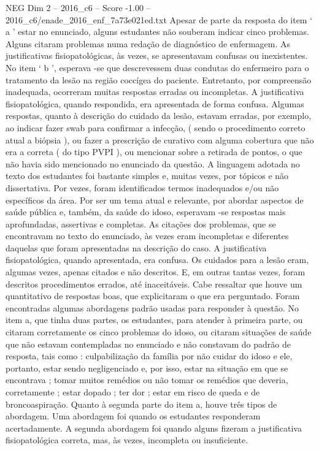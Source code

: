\begin{textsample}{NEG Dim 2 – 2016\_c6 – Score -1.00 – 2016\_c6/enade\_2016\_enf\_7a73e021ed.txt}
Apesar de parte da resposta do item ‘ a ’ estar no enunciado, alguns estudantes não souberam indicar cinco problemas.
Alguns citaram problemas numa redação de diagnóstico de enfermagem.
As justificativas fisiopatológicas, às vezes, se apresentavam confusas ou inexistentes.
No item ‘ b ’, esperava -se que descrevessem duas condutas do enfermeiro para o tratamento da lesão na região coccígea do paciente.
Entretanto, por compreensão inadequada, ocorreram muitas respostas erradas ou incompletas.
A justificativa fisiopatológica, quando respondida, era apresentada de forma confusa.
Algumas respostas, quanto à descrição do cuidado da lesão, estavam erradas, por exemplo, ao indicar fazer swab para confirmar a infecção, ( sendo o procedimento correto atual a biópsia ), ou fazer a prescrição de curativo com alguma cobertura que não era a correta ( do tipo PVPI ), ou mencionar sobre a retirada de pontos, o que não havia sido mencionado no enunciado da questão.
A linguagem adotada no texto dos estudantes foi bastante simples e, muitas vezes, por tópicos e não dissertativa.
Por vezes, foram identificados termos inadequados e/ou não específicos da área.
Por ser um tema atual e relevante, por abordar aspectos de saúde pública e, também, da saúde do idoso, esperavam -se respostas mais aprofundadas, assertivas e completas.
As citações dos problemas, que se encontravam no texto do enunciado, às vezes eram incompletas e diferentes daquelas que foram apresentadas na descrição do caso.
A justificativa fisiopatológica, quando apresentada, era confusa.
Os cuidados para a lesão eram, algumas vezes, apenas citados e não descritos.
E, em outras tantas vezes, foram descritos procedimentos errados, até inaceitáveis.
Cabe ressaltar que houve um quantitativo de respostas boas, que explicitaram o que era perguntado.
Foram encontradas algumas abordagens padrão usadas para responder à questão.
No item a, que tinha duas partes, os estudantes, para atender à primeira parte, ou citaram corretamente os cinco problemas do idoso, ou citaram situações de saúde que não estavam contempladas no enunciado e não constavam do padrão de resposta, tais como : culpabilização da família por não cuidar do idoso e ele, portanto, estar sendo negligenciado e, por isso, estar na situação em que se encontrava ; tomar muitos remédios ou não tomar os remédios que deveria, corretamente ; estar dopado ; ter dor ; estar em risco de queda e de broncoaspiração.
Quanto à segunda parte do item a, houve três tipos de abordagem.
Uma abordagem foi quando os estudantes responderam acertadamente.
A segunda abordagem foi quando alguns fizeram a justificativa fisiopatológica correta, mas, às vezes, incompleta ou insuficiente.

\end{textsample}
